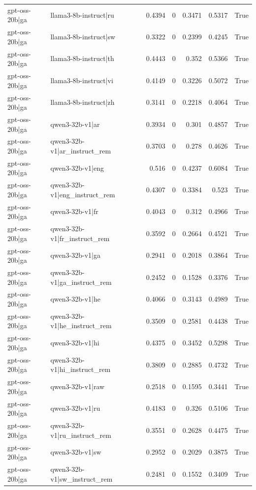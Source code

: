 \begin{table}
\begin{tabular}{l l r r r r l}
gpt-oss-20b|ga & llama3-8b-instruct|ru & 0.4394 & 0 & 0.3471 & 0.5317 & True \\
gpt-oss-20b|ga & llama3-8b-instruct|sw & 0.3322 & 0 & 0.2399 & 0.4245 & True \\
gpt-oss-20b|ga & llama3-8b-instruct|th & 0.4443 & 0 & 0.352 & 0.5366 & True \\
gpt-oss-20b|ga & llama3-8b-instruct|vi & 0.4149 & 0 & 0.3226 & 0.5072 & True \\
gpt-oss-20b|ga & llama3-8b-instruct|zh & 0.3141 & 0 & 0.2218 & 0.4064 & True \\
gpt-oss-20b|ga & qwen3-32b-v1|ar & 0.3934 & 0 & 0.301 & 0.4857 & True \\
gpt-oss-20b|ga & qwen3-32b-v1|ar_instruct_rem & 0.3703 & 0 & 0.278 & 0.4626 & True \\
gpt-oss-20b|ga & qwen3-32b-v1|eng & 0.516 & 0 & 0.4237 & 0.6084 & True \\
gpt-oss-20b|ga & qwen3-32b-v1|eng_instruct_rem & 0.4307 & 0 & 0.3384 & 0.523 & True \\
gpt-oss-20b|ga & qwen3-32b-v1|fr & 0.4043 & 0 & 0.312 & 0.4966 & True \\
gpt-oss-20b|ga & qwen3-32b-v1|fr_instruct_rem & 0.3592 & 0 & 0.2664 & 0.4521 & True \\
gpt-oss-20b|ga & qwen3-32b-v1|ga & 0.2941 & 0 & 0.2018 & 0.3864 & True \\
gpt-oss-20b|ga & qwen3-32b-v1|ga_instruct_rem & 0.2452 & 0 & 0.1528 & 0.3376 & True \\
gpt-oss-20b|ga & qwen3-32b-v1|he & 0.4066 & 0 & 0.3143 & 0.4989 & True \\
gpt-oss-20b|ga & qwen3-32b-v1|he_instruct_rem & 0.3509 & 0 & 0.2581 & 0.4438 & True \\
gpt-oss-20b|ga & qwen3-32b-v1|hi & 0.4375 & 0 & 0.3452 & 0.5298 & True \\
gpt-oss-20b|ga & qwen3-32b-v1|hi_instruct_rem & 0.3809 & 0 & 0.2885 & 0.4732 & True \\
gpt-oss-20b|ga & qwen3-32b-v1|raw & 0.2518 & 0 & 0.1595 & 0.3441 & True \\
gpt-oss-20b|ga & qwen3-32b-v1|ru & 0.4183 & 0 & 0.326 & 0.5106 & True \\
gpt-oss-20b|ga & qwen3-32b-v1|ru_instruct_rem & 0.3551 & 0 & 0.2628 & 0.4475 & True \\
gpt-oss-20b|ga & qwen3-32b-v1|sw & 0.2952 & 0 & 0.2029 & 0.3875 & True \\
gpt-oss-20b|ga & qwen3-32b-v1|sw_instruct_rem & 0.2481 & 0 & 0.1552 & 0.3409 & True \\

\end{tabular}
\end{table}
